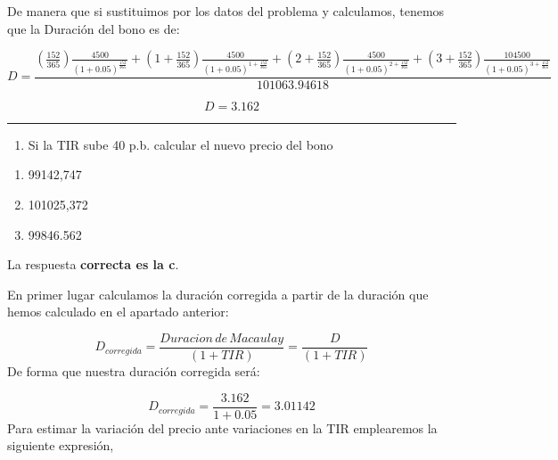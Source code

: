 \documentclass[
  letterpaper,
  DIV=11,
  numbers=noendperiod]{scrreprt}
\providecommand{\tightlist}{%
  \setlength{\itemsep}{0pt}\setlength{\parskip}{0pt}}\usepackage{longtable,booktabs,array}
\begin{document}
\begin{tcolorbox}
\begin{tcolorbox}
De manera que si sustituimos por los datos del problema y calculamos,
tenemos que la Duración del bono es de:

\[D=\frac{\left(\frac{152}{365}\right)\frac{4500}{\left(1+0.05\right)^{\frac{152}{365}}}+\left(1+\frac{152}{365}\right)\frac{4500}{\left(1+0.05\right)^{1+\frac{152}{365}}}+\left(2+\frac{152}{365}\right)\frac{4500}{\left(1+0.05\right)^{2+\frac{152}{365}}}+\left(3+\frac{152}{365}\right)\frac{104500}{\left(1+0.05\right)^{3+\frac{152}{365}}}}{101063.94618}\]

\[D=3.162\]

\end{tcolorbox}

\begin{center}\rule{0.5\linewidth}{0.5pt}\end{center}

\begin{enumerate}
\def\labelenumi{\arabic{enumi}.}
\setcounter{enumi}{2}
\tightlist
\item
  Si la TIR sube 40 p.b. calcular el nuevo precio del bono
\end{enumerate}

\begin{enumerate}
\def\labelenumi{\alph{enumi}.}
\item
  99142,747
\item
  101025,372
\item
  99846.562
\end{enumerate}

\begin{tcolorbox}[enhanced jigsaw, toprule=.15mm, left=2mm, breakable, opacitybacktitle=0.6, toptitle=1mm, coltitle=black, arc=.35mm, leftrule=.75mm, bottomtitle=1mm, titlerule=0mm, title=\textcolor{quarto-callout-tip-color}{\faLightbulb}\hspace{0.5em}{Solución}, rightrule=.15mm, opacityback=0, bottomrule=.15mm, colback=white, colframe=quarto-callout-tip-color-frame, colbacktitle=quarto-callout-tip-color!10!white]

La respuesta \textbf{correcta es la c}.

En primer lugar calculamos la duración corregida a partir de la duración
que hemos calculado en el apartado anterior:

\[D_{corregida}=\frac{Duracion\,de\, Macaulay}{\left(1+TIR\right)}=\frac{D}{\left(1+TIR\right)} \]
De forma que nuestra duración corregida será:

\[D_{corregida}=\frac{3.162}{1+0.05}=3.01142\] Para estimar la variación
del precio ante variaciones en la TIR emplearemos la siguiente
expresión,


\end{tcolorbox}
\end{tcolorbox}
\end{document}
